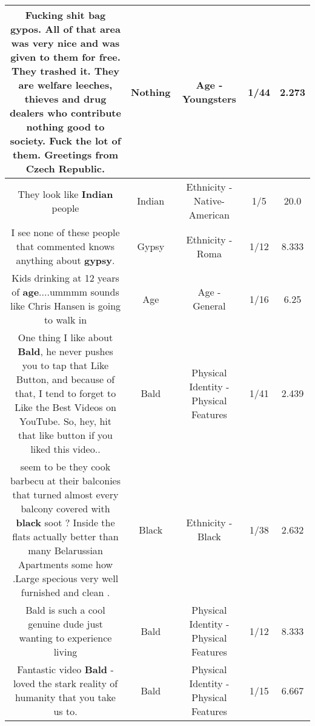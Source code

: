 \documentclass[11pt]{article}
\newlength\mylength
\begin{document}
\begin{center}
\begin{longtable}{|C{.65\mylength}|C{.30\mylength}|C{.12\mylength}|C{.12\mylength}|C{.12\mylength}|}
  \small Fucking shit bag gypos. All of that area was very nice and was given to them for free. They trashed it. They are welfare leeches, thieves and drug dealers who contribute \textbf{nothing} good to society. Fuck the lot of them. Greetings from Czech Republic.\normalsize   & Nothing & Age - Youngsters & 1/44 & 2.273 \\  \hline
  \small They look like \textbf{Indian} people\normalsize   & Indian & Ethnicity - Native-American & 1/5 & 20.0 \\  \hline
  \small I see none of these people that commented knows anything about \textbf{gypsy}.\normalsize   & Gypsy & Ethnicity - Roma & 1/12 & 8.333 \\  \hline
  \small Kids drinking at 12 years of \textbf{age}....ummmm sounds like Chris Hansen is going to walk in\normalsize   & Age & Age - General & 1/16 & 6.25 \\  \hline
  \small One thing I like about \textbf{Bald}, he never pushes you to tap that Like Button, and because of that, I tend to forget to Like the Best Videos on YouTube.  So, hey, hit that like button if you liked this video..\normalsize   & Bald & Physical Identity - Physical Features & 1/41 & 2.439 \\  \hline
  \small seem to be they cook barbecu at their balconies that turned almost every balcony covered with \textbf{black} soot ? Inside the flats actually better than many Belarussian Apartments some how .Large specious very well furnished and clean .\normalsize   & Black & Ethnicity - Black & 1/38 & 2.632 \\  \hline
  \small Bald is such a cool genuine dude just wanting to experience living\normalsize   & Bald & Physical Identity - Physical Features & 1/12 & 8.333 \\  \hline
  \small Fantastic video \textbf{Bald} - loved the stark reality of humanity that you take us to.\normalsize   & Bald & Physical Identity - Physical Features & 1/15 & 6.667 \\  \hline

\end{longtable}
\end{center}
\end{document}
